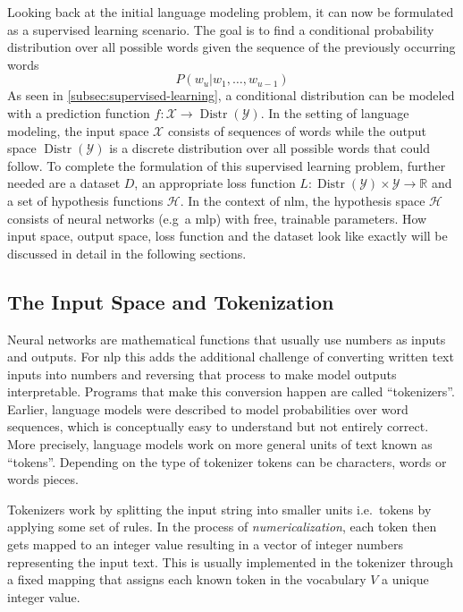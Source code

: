 Looking back at the initial language modeling problem, it can now be formulated as a supervised learning scenario.
The goal is to find a conditional probability distribution over all possible words given the sequence of the previously occurring words
\[
    P(w_u | w_1, \dots , w_{u-1})
\]
As seen in \autoref{subsec:supervised-learning}, a conditional distribution can be modeled with a prediction function $f: \mathcal{X} \rightarrow \operatorname{Distr}(\mathcal{Y})$.
In the setting of language modeling, the input space $\mathcal{X}$ consists of sequences of words while the output space $\operatorname{Distr}(\mathcal{Y})$ is a discrete distribution over all possible words that could follow.
To complete the formulation of this supervised learning problem, further needed are a dataset $D$, an appropriate loss function $L: \operatorname{Distr}(\mathcal{Y}) \times \mathcal{Y} \rightarrow \mathbb{R}$ and a set of hypothesis functions $\mathcal{H}$.
In the context of \acrlong{nlm}, the hypothesis space $\mathcal{H}$ consists of neural networks (e.g\ a \gls{mlp}) with free, trainable parameters.
How input space, output space, loss function and the dataset look like exactly will be discussed in detail in the following sections.



\subsection{The Input Space and Tokenization}\label{subsec:tokenization}
Neural networks are mathematical functions that usually use numbers as inputs and outputs.
For \gls{nlp} this adds the additional challenge of converting written text inputs into numbers and reversing that process to make model outputs interpretable.
Programs that make this conversion happen are called \enquote{tokenizers}.
Earlier, language models were described to model probabilities over word sequences, which is conceptually easy to understand but not entirely correct.
More precisely, language models work on more general units of text known as \enquote{tokens}.
Depending on the type of tokenizer tokens can be characters, words or words pieces.

Tokenizers work by splitting the input string into smaller units i.e.\ tokens by applying some set of rules.
In the process of \textit{numericalization}, each token then gets mapped to an integer value resulting in a vector of integer numbers representing the input text.
This is usually implemented in the tokenizer through a fixed mapping that assigns each known token in the vocabulary $V$ a unique integer value.

